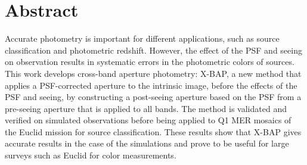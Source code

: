 \chapter{Abstract}

Accurate photometry is important for different applications, such as source classification and photometric redshift. However, the effect of the PSF and seeing on observation results in systematic errors in the photometric colors of sources. This work develops cross-band aperture photometry: X-BAP, a new method that applies a PSF-corrected aperture to the intrinsic image, before the effects of the PSF and seeing, by constructing a post-seeing aperture based on the PSF from a pre-seeing aperture that is applied to all bands. The method is validated and verified on simulated observations before being applied to Q1 MER mosaics of the Euclid mission for source classification. These results show that X-BAP gives accurate results in the case of the simulations and prove to be useful for large surveys such as Euclid for color measurements.